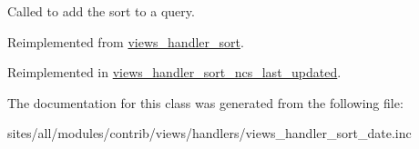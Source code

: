 Called to add the sort to a query. 

Reimplemented from \hyperlink{classviews__handler__sort_94fa33c5d037e41a927583fce2df3d18}{views\_\-handler\_\-sort}.

Reimplemented in \hyperlink{classviews__handler__sort__ncs__last__updated_05d2ef9eb8727ee81915b34254d99355}{views\_\-handler\_\-sort\_\-ncs\_\-last\_\-updated}.

The documentation for this class was generated from the following file:\begin{CompactItemize}
\item 
sites/all/modules/contrib/views/handlers/views\_\-handler\_\-sort\_\-date.inc\end{CompactItemize}
